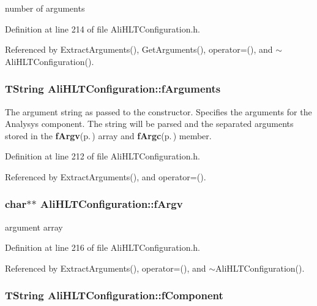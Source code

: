 number of arguments 

Definition at line 214 of file Ali\-HLTConfiguration.h.

Referenced by Extract\-Arguments(), Get\-Arguments(), operator=(), and $\sim$Ali\-HLTConfiguration().
\subsubsection{\setlength{\rightskip}{0pt plus 5cm}TString {\bf Ali\-HLTConfiguration::f\-Arguments}\hspace{0.3cm}{\tt  [private]}}\label{classAliHLTConfiguration_r6}


The argument string as passed to the constructor. Specifies the arguments for the Analysys component. The string will be parsed and the separated arguments stored in the {\bf f\-Argv}{\rm (p.\,\pageref{classAliHLTConfiguration_r8})} array and {\bf f\-Argc}{\rm (p.\,\pageref{classAliHLTConfiguration_r7})} member. 

Definition at line 212 of file Ali\-HLTConfiguration.h.

Referenced by Extract\-Arguments(), and operator=().
\subsubsection{\setlength{\rightskip}{0pt plus 5cm}char$\ast$$\ast$ {\bf Ali\-HLTConfiguration::f\-Argv}\hspace{0.3cm}{\tt  [private]}}\label{classAliHLTConfiguration_r8}


argument array 

Definition at line 216 of file Ali\-HLTConfiguration.h.

Referenced by Extract\-Arguments(), operator=(), and $\sim$Ali\-HLTConfiguration().
\subsubsection{\setlength{\rightskip}{0pt plus 5cm}TString {\bf Ali\-HLTConfiguration::f\-Component}\hspace{0.3cm}{\tt  [private]}}\label{classAliHLTConfiguration_r1}


